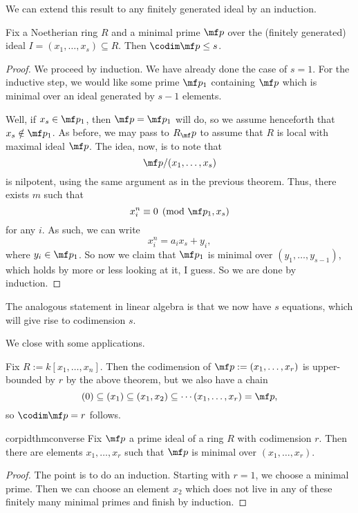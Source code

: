 We can extend this result to any finitely generated ideal by an induction.
\begin{theorem}
	Fix a Noetherian ring $R$ and a minimal prime $\mf p$ over the (finitely generated) ideal $I=(x_1,\ldots,x_s)\subseteq R$. Then $\codim\mf p\le s$.
\end{theorem}
\begin{proof}
	We proceed by induction. We have already done the case of $s=1$. For the inductive step, we would like some prime $\mf p_1$ containing $\mf p$ which is minimal over an ideal generated by $s-1$ elements.

	Well, if $x_s\in\mf p_1$, then $\mf p=\mf p_1$ will do, so we assume henceforth that $x_s\notin\mf p_1$. As before, we may pass to $R_\mf p$ to assume that $R$ is local with maximal ideal $\mf p$. The idea, now, is to note that
	\[\mf p/(x_1,\ldots,x_s)\]
	is nilpotent, using the same argument as in the previous theorem. Thus, there exists $m$ such that
	\[x_i^n\equiv0\pmod{\mf p_1,x_s}\]
	for any $i$. As such, we can write
	\[x_i^n=a_ix_s+y_i,\]
	where $y_i\in\mf p_1$. So now we claim that $\mf p_1$ is minimal over $(y_1,\ldots,y_{s-1})$, which holds by more or less looking at it, I guess. So we are done by induction.
\end{proof}
\begin{remark}
	The analogous statement in linear algebra is that we now have $s$ equations, which will give rise to codimension $s$.
\end{remark}
We close with some applications.
\begin{example}
	Fix $R:=k[x_1,\ldots,x_n]$. Then the codimension of $\mf p:=(x_1,\ldots,x_r)$ is upper-bounded by $r$ by the above theorem, but we also have a chain
	\[(0)\subseteq(x_1)\subseteq(x_1,x_2)\subseteq\cdots(x_1,\ldots,x_r)=\mf p,\]
	so $\codim\mf p=r$ follows.
\end{example}
\begin{restatable}{cor}{pidthmconverse}
	Fix $\mf p$ a prime ideal of a ring $R$ with codimension $r$. Then there are elements $x_1,\ldots,x_r$ such that $\mf p$ is minimal over $(x_1,\ldots,x_r)$.
\end{restatable} %
\begin{proof}
	The point is to do an induction. Starting with $r=1$, we choose a minimal prime. Then we can choose an element $x_2$ which does not live in any of these finitely many minimal primes and finish by induction.
\end{proof}